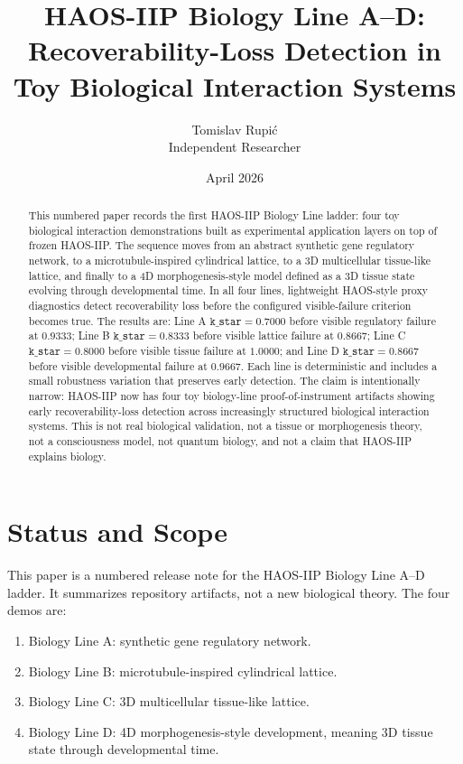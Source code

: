 \documentclass[11pt]{article}
\title{HAOS-IIP Biology Line A--D:\\Recoverability-Loss Detection in Toy Biological Interaction Systems}
\author{Tomislav Rupi\'c \\ Independent Researcher}
\date{April 2026}
\begin{document}
\maketitle

\begin{abstract}
This numbered paper records the first HAOS-IIP Biology Line ladder: four toy biological interaction demonstrations built as experimental application layers on top of frozen HAOS-IIP. The sequence moves from an abstract synthetic gene regulatory network, to a microtubule-inspired cylindrical lattice, to a 3D multicellular tissue-like lattice, and finally to a 4D morphogenesis-style model defined as a 3D tissue state evolving through developmental time. In all four lines, lightweight HAOS-style proxy diagnostics detect recoverability loss before the configured visible-failure criterion becomes true. The results are: Line A \(\texttt{k\_star}=0.7000\) before visible regulatory failure at \(0.9333\); Line B \(\texttt{k\_star}=0.8333\) before visible lattice failure at \(0.8667\); Line C \(\texttt{k\_star}=0.8000\) before visible tissue failure at \(1.0000\); and Line D \(\texttt{k\_star}=0.8667\) before visible developmental failure at \(0.9667\). Each line is deterministic and includes a small robustness variation that preserves early detection. The claim is intentionally narrow: HAOS-IIP now has four toy biology-line proof-of-instrument artifacts showing early recoverability-loss detection across increasingly structured biological interaction systems. This is not real biological validation, not a tissue or morphogenesis theory, not a consciousness model, not quantum biology, and not a claim that HAOS-IIP explains biology.
\end{abstract}

\tableofcontents

\section{Status and Scope}

This paper is a numbered release note for the HAOS-IIP Biology Line A--D ladder. It summarizes repository artifacts, not a new biological theory. The four demos are:

\begin{enumerate}
\item Biology Line A: synthetic gene regulatory network.
\item Biology Line B: microtubule-inspired cylindrical lattice.
\item Biology Line C: 3D multicellular tissue-like lattice.
\item Biology Line D: 4D morphogenesis-style development, meaning 3D tissue state through developmental time.
\end{enumerate}
\end{document}
